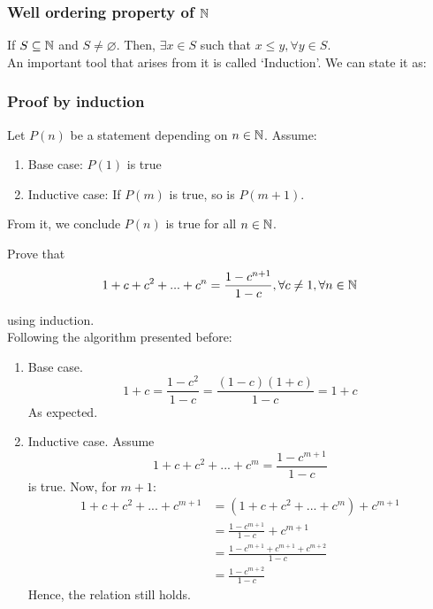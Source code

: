 \subsubsection{Well ordering property of $\mathbb{N}$}

If $S \subseteq \mathbb{N}$ and $S \neq \varnothing$. Then, $\exists x \in S$ such that $x \leq y, \forall y \in S$. \\

An important tool that arises from it is called `Induction'. We can state it as:

\subsubsection{Proof by induction}

Let $P(n)$ be a statement depending on $n \in \mathbb{N}$. Assume:

\begin{enumerate}
    \item Base case: $P(1)$ is true
    \item Inductive case: If $P(m)$ is true, so is $P(m+1)$.
\end{enumerate}

From it, we conclude $P(n)$ is true for all $n \in \mathbb{N}$.

\begin{eg}
    Prove that 
    \begin{equation*}
        1 + c + c^2 + ... + c^n = \frac{1-c^{n+1}}{1-c}, \forall c \neq 1, \forall n \in \mathbb{N}
    \end{equation*}
    
    using induction. \\
    
    Following the algorithm presented before:
    \begin{enumerate}
        \item Base case.
            \begin{equation*}
                1 + c = \frac{1-c^2}{1 - c} = \frac{(1-c)(1+c)}{1-c} = 1 + c
            \end{equation*}
            As expected.
        \item Inductive case.
            Assume
            \begin{equation*}
                1 + c + c^2 + ... + c^m = \frac{1-c^{m+1}}{1-c}
            \end{equation*}
            is true. Now, for $m+1$:
            \begin{equation*}
                \begin{split}
                    1 + c + c^2 + ... + c^{m+1} & = (1 + c + c^2 + ... +c^{m}) + c^{m+1} \\
                    & = \frac{1-c^{m+1}}{1-c} + c^{m+1} \\
                    & = \frac{1-c^{m+1} + c^{m+1} + c^{m+2}}{1-c} \\
                    & = \frac{1-c^{m+2}}{1-c}
                \end{split}
            \end{equation*}
            Hence, the relation still holds.
    \end{enumerate}
\end{eg}


